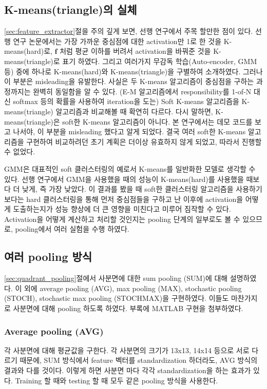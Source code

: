 \documentclass[a4paper,9pt,hidelinks]{article}
\begin{document}
\begin{multicols*}{2}
\subsection{K-means(triangle)의 실체}

\ref{sec:feature_extractor}절을 주의 깊게 보면, 선행 연구에서 주목 할만한 점이 있다.
선행 연구 논문에서는 가장 가까운 중심점에 대한 activation만 1로 한 것을 K-means(hard)로, $\mathbf{f}$ 처럼 평균 이하를 버려서 activation을 바꿔준 것을 K-means(triangle)로 표기 하였다.
그리고 여러가지 무감독 학습(Auto-encoder, GMM 등) 중에 하나로 K-means(hard)와 K-means(triangle)을 구별하여 소개하였다.
그러나 이 부분은 misleading을 유발한다.
사실은 두 K-means 알고리즘이 중심점을 구하는 과정까지는 완벽히 동일함을 알 수 있다.
(E-M 알고리즘에서 responsibility를 1-of-N 대신 softmax 등의 확률을 사용하여 iteration을 도는) Soft K-means 알고리즘을 K-means(triangle) 알고리즘과 비교해볼 때 확연히 다르다.
다시 말하면, K-means(triangle)은 soft한 K-means 알고리즘이 아니다.
본 연구에서는 데모 코드를 보고 나서야, 이 부분을 misleading 했다고 알게 되었다.
결국 여러 soft한 K-means 알고리즘을 구현하여 비교하려던 초기 계획은 더이상 유효하지 않게 되었고, 따라서 진행할 수 없었다.

GMM은 대표적인 soft 클러스터링의 예로서 K-means를 일반화한 모델로 생각할 수 있다.
선행 연구에서 GMM을 사용했을 때의 성능이 K-means(hard)를 사용했을 때보다 더 낮게, 즉 가장 낮았다.
이 결과를 봤을 때 soft한 클러스터링 알고리즘을 사용하기 보다는 hard 클러스터링을 통해 먼저 중심점들을 구하고 난 이후에 activation을 어떻게 도출하는지가 성능 향상에 더 큰 영향을 미친다고 미루어 짐작할 수 있다.
Activation을 어떻게 계산하고 처리할 것인지는 pooling 단계의 일부로도 볼 수 있으므로, pooling에서 여러 실험을 수행 하였다.

\subsection{여러 pooling 방식}

\ref{sec:quadrant_pooling}절에서 사분면에 대한 sum pooling (SUM)에 대해 설명하였다.
이 외에 average pooling (AVG), max pooling (MAX), stochastic pooling (STOCH), stochastic max pooling (STOCHMAX)을 구현하였다.
이들도 마찬가지로 사분면에 대해 pooling 하도록 하였다.
부록에 MATLAB 구현을 첨부하였다.

\subsubsection{Average pooling (AVG)}

각 사분면에 대해 평균값을 구한다.
각 사분면의 크기가 13x13, 14x14 등으로 서로 다르기 때문에, SUM 방식에서 feature 벡터를 standardization 하더라도, AVG 방식의 결과와 다를 것이다.
이렇게 하면 사분면 마다 각각 standardization을 하는 효과가 있다.
Training 할 때와 testing 할 때 모두 같은 pooling 방식을 사용한다.


\end{multicols*}
\end{document}

